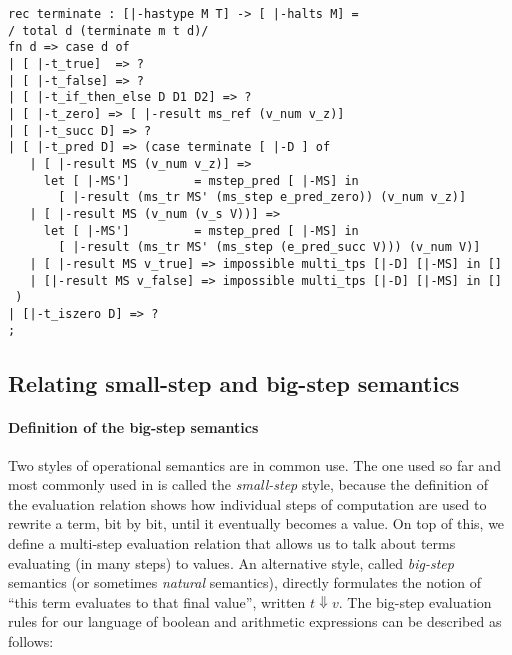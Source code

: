 \begin{lstlisting}
rec terminate : [|-hastype M T] -> [ |-halts M] =
/ total d (terminate m t d)/
fn d => case d of
| [ |-t_true]  => ?
| [ |-t_false] => ?
| [ |-t_if_then_else D D1 D2] => ?
| [ |-t_zero] => [ |-result ms_ref (v_num v_z)]
| [ |-t_succ D] => ?
| [ |-t_pred D] => (case terminate [ |-D ] of
   | [ |-result MS (v_num v_z)] =>
     let [ |-MS']         = mstep_pred [ |-MS] in
       [ |-result (ms_tr MS' (ms_step e_pred_zero)) (v_num v_z)]
   | [ |-result MS (v_num (v_s V))] =>
     let [ |-MS']         = mstep_pred [ |-MS] in
       [ |-result (ms_tr MS' (ms_step (e_pred_succ V))) (v_num V)]
   | [ |-result MS v_true] => impossible multi_tps [|-D] [|-MS] in []
   | [|-result MS v_false] => impossible multi_tps [|-D] [|-MS] in []
 )
| [|-t_iszero D] => ?
;
\end{lstlisting}

\subsection{Relating small-step and big-step semantics}


\paragraph{Definition of the big-step semantics}

Two styles of operational semantics are in common use. The one used so far and
most commonly used in \cite{TAPL} is called the {\em small-step} style, because the definition of the
evaluation relation shows how individual steps of computation are used to
rewrite a term, bit by bit, until it eventually becomes a value. On top of this,
we define a multi-step evaluation relation that allows us to talk about terms
evaluating (in many steps) to values. An alternative style, called
{\em big-step} semantics (or sometimes {\em natural} semantics), directly
formulates the notion of ``this term evaluates to that final value'', written
$t \Downarrow v$. The big-step evaluation rules for our language of boolean and
arithmetic expressions can be described as follows:

